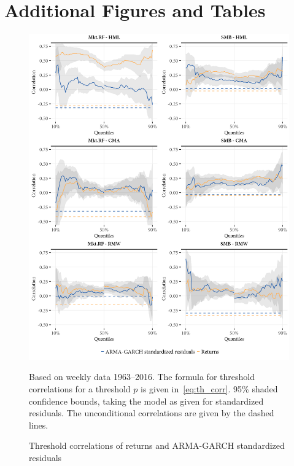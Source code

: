 
\section{Additional Figures and Tables} %
\label{app:supplementary}


\begin{figure}[H]
  \centering
  \includegraphics[scale=1]{graphics/appendix_threshold_1.png}
  \footnotesize
  \caption{Threshold correlations of returns and ARMA-GARCH standardized residuals}
  \begin{longcaption}
    Based on weekly data 1963--2016. The formula for threshold correlations for a threshold $p$ is given in~\autoref{eq:th_corr}. 95\% shaded confidence bounds, taking the model as given for standardized residuals. The unconditional correlations are given by the dashed lines.
  \end{longcaption}
  \label{fig:appendix_threshold1}
\end{figure}
